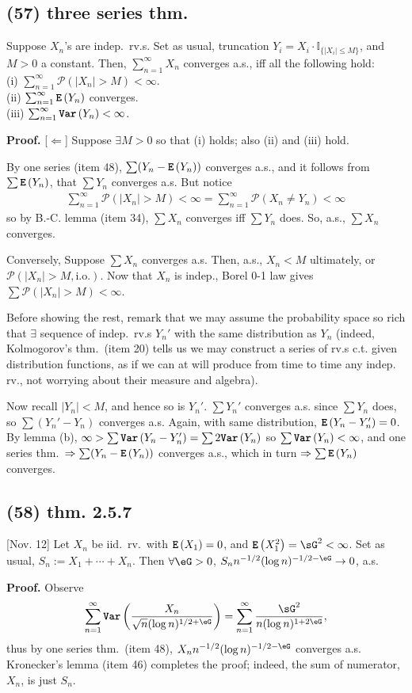 \documentclass[12pt]{article}
\newcommand{\oo}\infty%
\newcommand{\F}\frac%
\newcommand{\R}\sqrt%
\newcommand{\M}\cdot%
\newcommand{\Ev}\forall%
\newcommand{\Ex}\exists%
\newcommand{\Ip}{\Rightarrow} %
\newcommand{\Rb}[1]{ \left( #1 \right) }%
\newcommand{\BF}[1]{ \mathbb{#1} }%
\newcommand{\CF}[1]{ \mathcal{#1} }%
\newcommand{\Ss}[1]{\textsf{\bfseries{#1}}}%
\newcommand{\Tw}[1]{\texttt{\bfseries{#1}}}%
\newcommand{\EqGo}[1]{ \begin{gather*}{#1}\end{gather*} } %
\renewcommand{\P}[1]{ \CF P \Rb{#1} }%
\newcommand{\E}[1]{ \Tw{E}\Rb{#1} }%
\newcommand{\Var}[1]{ \Tw{Var}\Rb{#1} }%
\newcommand{\I}[1]{ \BF I_{\{#1\}} }%
\begin{document}
\subsection*{(57) three series thm.} Suppose \(X_n\)'s are indep.\ rv.s. Set as usual, truncation \(Y_i = X_i \M \I{|X_i| \leq M}\), and \(M>0\) a constant. 
Then, \(\sum_{n=1}^\oo X_n\) converges a.s., iff all the following hold: \\
\indent (i) \(\sum_{n=1}^\oo \P{|X_n| >M} <\oo \). \\
\indent (ii) \(\sum_{n=1}^\oo \E{Y_n}\) converges. \\
\indent (iii) \(\sum_{n=1}^\oo \Var{Y_n} <\oo \). \par
\Ss{Proof.} [\(\Leftarrow\)] Suppose \(\Ex M>0\) so that (i) holds; also (ii) and (iii) hold. \par
By one series (item 48), \(\sum(Y_n -\E{Y_n})\) converges a.s., 
and it follows from \(\sum \E{Y_n}\), that \(\sum Y_n\) converges a.s. 
But notice \EqGo{
 \sum_{n=1}^\oo \P{|X_n| >M} <\oo
 = \sum_{n=1}^\oo \P{X_n \neq Y_n} <\oo 
} so by B.-C. lemma (item 34), \(\sum X_n\) converges iff \(\sum Y_n\) does. 
So, a.s., \(\sum X_n\) converges. \par
[\(\Ip\)] Conversely, Suppose \(\sum X_n\) converges a.s. 
Then, a.s., \(X_n <M\) ultimately, or \(\P{|X_n| >M, \mathrm{i.o.}}\). 
Now that \(X_n\) is indep., Borel 0-1 law gives \(\sum \P{|X_n| >M} <\oo\). \par
Before showing the rest, remark that we may assume the probability space so rich that \(\Ex\) sequence of indep.\ rv.s \(Y_n'\) with the same distribution as \(Y_n\) (indeed, Kolmogorov's thm.\ (item 20) tells us we may construct a series of rv.s c.t. given distribution functions, as if we can at will produce from time to time any indep. rv., not worrying about their measure and algebra). \par
Now recall \(|Y_n| <M\), and hence so is \(Y_n'\). 
\(\sum Y_n'\) converges a.s. since \(\sum Y_n\) does, so \(\sum (Y_n'-Y_n)\) converges a.s. 
Again, with same distribution, \(\E{Y_n-Y_n'} =0\). 
By lemma (b), \(\oo > \sum \Var{Y_n - Y_n'} = \sum 2 \Var{Y_n}\)
so \(\sum \Var{Y_n} <\oo\), and one series thm.\ \(\Ip \sum (Y_n -\E{Y_n})\) converges a.s., 
which in turn \(\Ip \sum \E{Y_n}\) converges. 

\subsection*{(58) thm. 2.5.7} [Nov. 12] Let \(X_n\) be iid.\ rv.\ with \(\E{X_1} =0\), and \(\E{X_1^2} =\sG^2 <\oo\). Set as usual, \(S_n := X_1 +\dotsb+ X_n\). 
Then \(\Ev \eG >0\), \(S_n n^{-1/2} (\log n)^{-1/2-\eG} \to 0\), a.s. \par
\Ss{Proof.} Observe \EqGo{
 \sum_{n=1}^\oo \Var{\F{X_n} {\R{n} (\log n)^{1/2+\eG}}}
 = \sum_{n=1}^\oo \F{\sG^2} {n (\log n)^{1+2\eG}},
} thus by one series thm.\ (item 48), \(X_n n^{-1/2} (\log n)^{-1/2-\eG}\) converges a.s. 
Kronecker's lemma (item 46) completes the proof; indeed, the sum of numerator, \(X_n\), is just \(S_n\). 
\end{document}
